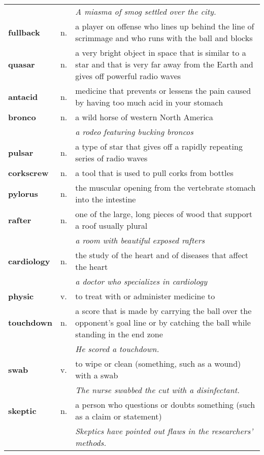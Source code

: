 \documentclass[a4paper]{article}
\begin{document}
\begin{longtable}{llp{11cm}}
 & & \textit{A miasma of smog settled over the city.}\\[0.08cm]
\textbf{fullback} & n. &  a player on offense who lines up behind the line of scrimmage and who runs with the ball and blocks\\[0.08cm]
\textbf{quasar} & n. &  a very bright object in space that is similar to a star and that is very far away from the Earth and gives off powerful radio waves\\[0.08cm]
\textbf{antacid} & n. &  medicine that prevents or lessens the pain caused by having too much acid in your stomach\\[0.08cm]
\textbf{bronco} & n. &  a wild horse of western North America \\
 & & \textit{a rodeo featuring bucking broncos}\\[0.08cm]
\textbf{pulsar} & n. &  a type of star that gives off a rapidly repeating series of radio waves\\[0.08cm]
\textbf{corkscrew} & n. &  a tool that is used to pull corks from bottles\\[0.08cm]
\textbf{pylorus} & n. &  the muscular opening from the vertebrate stomach into the intestine\\[0.08cm]
\textbf{rafter} & n. &  one of the large, long pieces of wood that support a roof usually plural \\
 & & \textit{a room with beautiful exposed rafters}\\[0.08cm]
\textbf{cardiology} & n. &  the study of the heart and of diseases that affect the heart \\
 & & \textit{a doctor who specializes in cardiology}\\[0.08cm]
\textbf{physic} & v. &  to treat with or administer medicine to\\[0.08cm]
\textbf{touchdown} & n. &  a score that is made by carrying the ball over the opponent's goal line or by catching the ball while standing in the end zone \\
 & & \textit{He scored a touchdown.}\\[0.08cm]
\textbf{swab} & v. &  to wipe or clean (something, such as a wound) with a swab \\
 & & \textit{The nurse swabbed the cut with a disinfectant.}\\[0.08cm]
\textbf{skeptic} & n. &  a person who questions or doubts something (such as a claim or statement) \\
 & & \textit{Skeptics have pointed out flaws in the researchers' methods.}\\[0.08cm]

\end{longtable}
\end{document}
